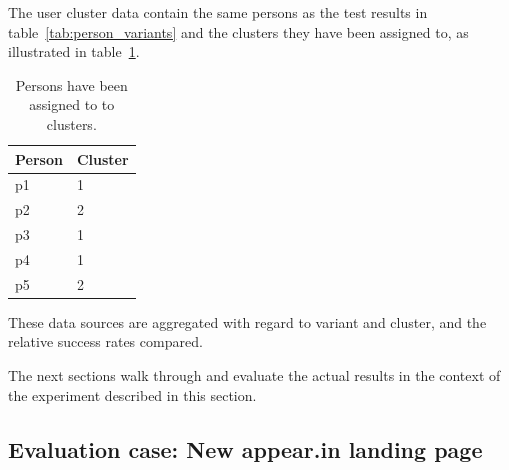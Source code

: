 The user cluster data contain the same persons as the test results in table~\ref{tab:person_variants} and the clusters they have been assigned to, as illustrated in table~\ref{tab:person_clusters}.

\begin{table}[h]
  \centering
  \begin{tabular}{|l|l|}
    \hline
    Person & Cluster \\ \hline
    p1     & 1 \\
    p2     & 2 \\
    p3     & 1 \\
    p4     & 1 \\
    p5     & 2 \\ \hline
  \end{tabular}
  \caption{Persons have been assigned to to clusters.}
  \label{tab:person_clusters}
\end{table}

These data sources are aggregated with regard to variant and cluster, and the relative success rates compared.

The next sections walk through and evaluate the actual results in the context of the experiment described in this section.

\subsection{Evaluation case: New appear.in landing page}
\label{eval:sub:new_landing_page}

